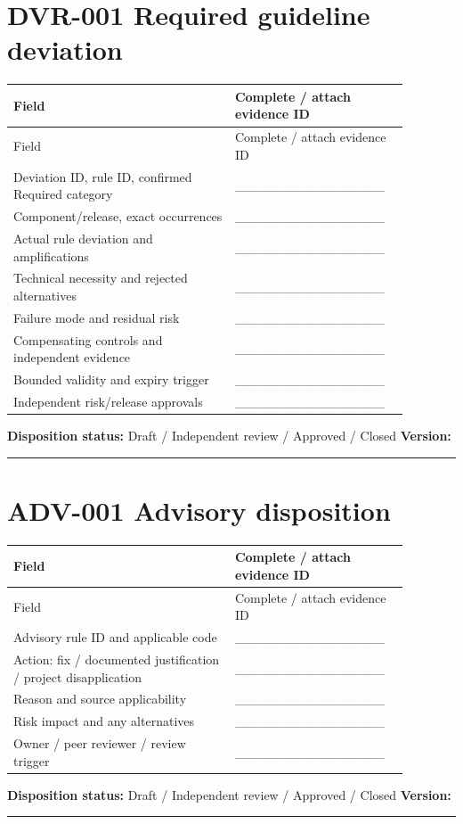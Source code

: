 \documentclass[10pt,letterpaper]{article}
\begin{document}
\section{DVR-001 Required guideline deviation}
\small\setlength{\tabcolsep}{3pt}\renewcommand{\arraystretch}{1.15}
\begin{longtable}{p{0.52\linewidth}p{0.36\linewidth}}
\toprule
Field & Complete / attach evidence ID\\ \midrule
\endfirsthead
\toprule
Field & Complete / attach evidence ID\\ \midrule
\endhead
Deviation ID, rule ID, confirmed Required category & \_\_\_\_\_\_\_\_\_\_\_\_\_\_\_\_\\
Component/release, exact occurrences & \_\_\_\_\_\_\_\_\_\_\_\_\_\_\_\_\\
Actual rule deviation and amplifications & \_\_\_\_\_\_\_\_\_\_\_\_\_\_\_\_\\
Technical necessity and rejected alternatives & \_\_\_\_\_\_\_\_\_\_\_\_\_\_\_\_\\
Failure mode and residual risk & \_\_\_\_\_\_\_\_\_\_\_\_\_\_\_\_\\
Compensating controls and independent evidence & \_\_\_\_\_\_\_\_\_\_\_\_\_\_\_\_\\
Bounded validity and expiry trigger & \_\_\_\_\_\_\_\_\_\_\_\_\_\_\_\_\\
Independent risk/release approvals & \_\_\_\_\_\_\_\_\_\_\_\_\_\_\_\_\\
\bottomrule
\end{longtable}
\normalsize
\textbf{Disposition status:} Draft / Independent review / Approved / Closed \quad \textbf{Version:} \rule{1.4cm}{0.4pt}

\section{ADV-001 Advisory disposition}
\small\setlength{\tabcolsep}{3pt}\renewcommand{\arraystretch}{1.15}
\begin{longtable}{p{0.52\linewidth}p{0.36\linewidth}}
\toprule
Field & Complete / attach evidence ID\\ \midrule
\endfirsthead
\toprule
Field & Complete / attach evidence ID\\ \midrule
\endhead
Advisory rule ID and applicable code & \_\_\_\_\_\_\_\_\_\_\_\_\_\_\_\_\\
Action: fix / documented justification / project disapplication & \_\_\_\_\_\_\_\_\_\_\_\_\_\_\_\_\\
Reason and source applicability & \_\_\_\_\_\_\_\_\_\_\_\_\_\_\_\_\\
Risk impact and any alternatives & \_\_\_\_\_\_\_\_\_\_\_\_\_\_\_\_\\
Owner / peer reviewer / review trigger & \_\_\_\_\_\_\_\_\_\_\_\_\_\_\_\_\\
\bottomrule
\end{longtable}
\normalsize
\textbf{Disposition status:} Draft / Independent review / Approved / Closed \quad \textbf{Version:} \rule{1.4cm}{0.4pt}
\end{document}
